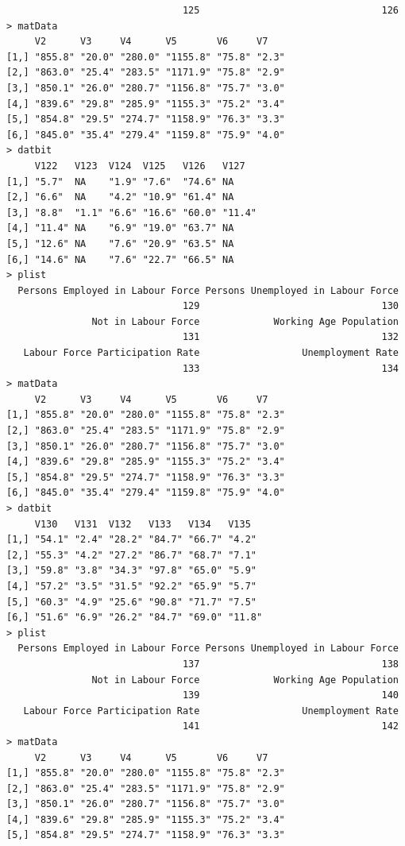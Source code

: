 \documentclass[a4paper]{article}
\begin{document}
\begin{verbatim}
                               125                                126 
> matData 
     V2      V3     V4      V5       V6     V7   
[1,] "855.8" "20.0" "280.0" "1155.8" "75.8" "2.3"
[2,] "863.0" "25.4" "283.5" "1171.9" "75.8" "2.9"
[3,] "850.1" "26.0" "280.7" "1156.8" "75.7" "3.0"
[4,] "839.6" "29.8" "285.9" "1155.3" "75.2" "3.4"
[5,] "854.8" "29.5" "274.7" "1158.9" "76.3" "3.3"
[6,] "845.0" "35.4" "279.4" "1159.8" "75.9" "4.0"
> datbit 
     V122   V123  V124  V125   V126   V127  
[1,] "5.7"  NA    "1.9" "7.6"  "74.6" NA    
[2,] "6.6"  NA    "4.2" "10.9" "61.4" NA    
[3,] "8.8"  "1.1" "6.6" "16.6" "60.0" "11.4"
[4,] "11.4" NA    "6.9" "19.0" "63.7" NA    
[5,] "12.6" NA    "7.6" "20.9" "63.5" NA    
[6,] "14.6" NA    "7.6" "22.7" "66.5" NA    
> plist 
  Persons Employed in Labour Force Persons Unemployed in Labour Force 
                               129                                130 
               Not in Labour Force             Working Age Population 
                               131                                132 
   Labour Force Participation Rate                  Unemployment Rate 
                               133                                134 
> matData 
     V2      V3     V4      V5       V6     V7   
[1,] "855.8" "20.0" "280.0" "1155.8" "75.8" "2.3"
[2,] "863.0" "25.4" "283.5" "1171.9" "75.8" "2.9"
[3,] "850.1" "26.0" "280.7" "1156.8" "75.7" "3.0"
[4,] "839.6" "29.8" "285.9" "1155.3" "75.2" "3.4"
[5,] "854.8" "29.5" "274.7" "1158.9" "76.3" "3.3"
[6,] "845.0" "35.4" "279.4" "1159.8" "75.9" "4.0"
> datbit 
     V130   V131  V132   V133   V134   V135  
[1,] "54.1" "2.4" "28.2" "84.7" "66.7" "4.2" 
[2,] "55.3" "4.2" "27.2" "86.7" "68.7" "7.1" 
[3,] "59.8" "3.8" "34.3" "97.8" "65.0" "5.9" 
[4,] "57.2" "3.5" "31.5" "92.2" "65.9" "5.7" 
[5,] "60.3" "4.9" "25.6" "90.8" "71.7" "7.5" 
[6,] "51.6" "6.9" "26.2" "84.7" "69.0" "11.8"
> plist 
  Persons Employed in Labour Force Persons Unemployed in Labour Force 
                               137                                138 
               Not in Labour Force             Working Age Population 
                               139                                140 
   Labour Force Participation Rate                  Unemployment Rate 
                               141                                142 
> matData 
     V2      V3     V4      V5       V6     V7   
[1,] "855.8" "20.0" "280.0" "1155.8" "75.8" "2.3"
[2,] "863.0" "25.4" "283.5" "1171.9" "75.8" "2.9"
[3,] "850.1" "26.0" "280.7" "1156.8" "75.7" "3.0"
[4,] "839.6" "29.8" "285.9" "1155.3" "75.2" "3.4"
[5,] "854.8" "29.5" "274.7" "1158.9" "76.3" "3.3"

\end{verbatim}
\end{document}
